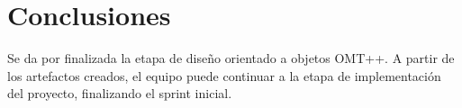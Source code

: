 \section{Conclusiones}
Se da por finalizada la etapa de diseño orientado a objetos OMT++. A partir de los artefactos creados, el equipo puede continuar a la etapa de implementación del proyecto, finalizando el sprint inicial.
